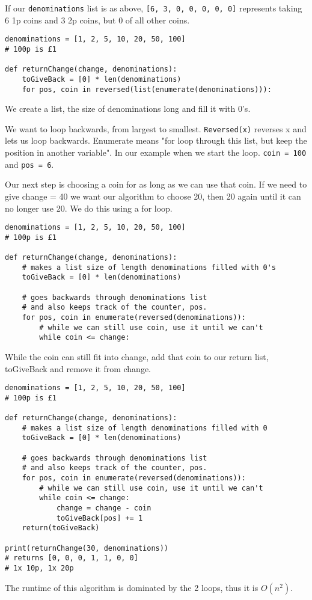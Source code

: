 \documentclass{article}
\newcommand{\code}[1]{\texttt{#1}}
\begin{document}
 If our \code{denominations} list is as above, \code{[6, 3, 0, 0, 0, 0, 0]} represents taking 6 1p coins and 3 2p coins, but 0 of all other coins.
 
 \begin{verbatim}
denominations = [1, 2, 5, 10, 20, 50, 100]
# 100p is £1

def returnChange(change, denominations):
	toGiveBack = [0] * len(denominations)
	for pos, coin in reversed(list(enumerate(denominations))):

\end{verbatim}
 We create a list, the size of denominations long and fill it with 0's. 
 
We want to loop backwards, from largest to smallest. \code{Reversed(x)} reverses x and lets us loop backwards. Enumerate means "for loop through this list, but keep the position in another variable". In our example when we start the loop. \code{coin = 100} and \code{pos = 6}.

Our next step is choosing a coin for as long as we can use that coin. If we need to give change = 40 we want our algorithm to choose 20, then 20 again until it can no longer use 20. We do this using a for loop. 
 \begin{verbatim}
denominations = [1, 2, 5, 10, 20, 50, 100]
# 100p is £1

def returnChange(change, denominations):
	# makes a list size of length denominations filled with 0's
	toGiveBack = [0] * len(denominations)

	# goes backwards through denominations list
	# and also keeps track of the counter, pos.
	for pos, coin in enumerate(reversed(denominations)):
		# while we can still use coin, use it until we can't
		while coin <= change:

\end{verbatim}
While the coin can still fit into change, add that coin to our return list, toGiveBack and remove it from change.

 \begin{verbatim}
denominations = [1, 2, 5, 10, 20, 50, 100]
# 100p is £1

def returnChange(change, denominations):
	# makes a list size of length denominations filled with 0
	toGiveBack = [0] * len(denominations)

	# goes backwards through denominations list
	# and also keeps track of the counter, pos.
	for pos, coin in enumerate(reversed(denominations)):
		# while we can still use coin, use it until we can't
		while coin <= change:
			change = change - coin
			toGiveBack[pos] += 1
	return(toGiveBack)
			
print(returnChange(30, denominations))
# returns [0, 0, 0, 1, 1, 0, 0]
# 1x 10p, 1x 20p
\end{verbatim}
The runtime of this algorithm is dominated by the 2 loops, thus it is $O(n^2)$.
\newpage
\end{document}
